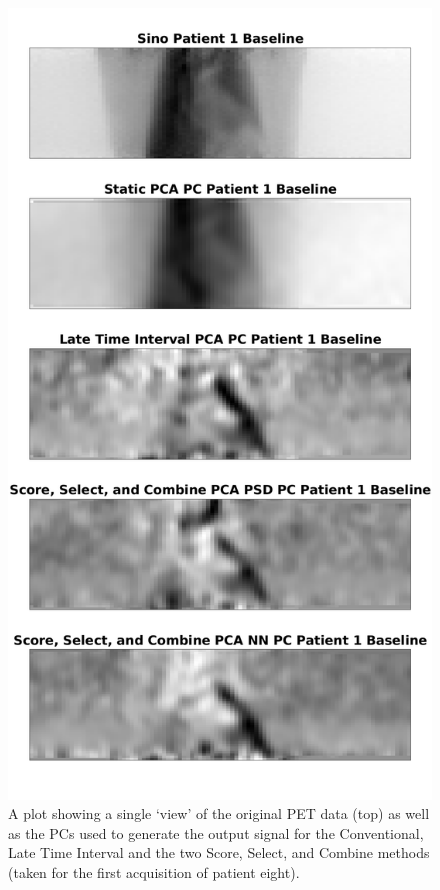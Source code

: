             \begin{figure}
                \centering
                
                \includegraphics[width=0.7\linewidth]{figures/data_driven_surrogate_signal_extraction_methods_1_patient_one_pc_output.png}
                
                \captionsetup{singlelinecheck=false}
                \caption{
                    A plot showing a single `view' of the original PET data (top) as well as the \glspl{PC} used to generate the output signal for the Conventional, Late Time Interval and the two Score, Select, and Combine methods (taken for the first acquisition of patient eight).
                }
                \label{fig:patient_one_pc_output}
            \end{figure}
            
